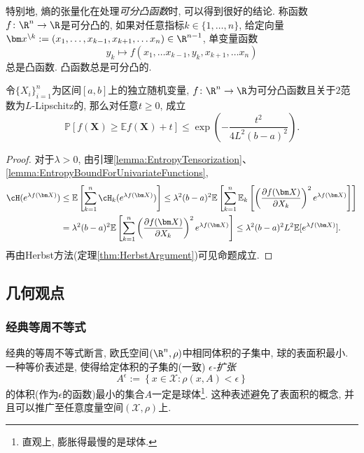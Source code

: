 特别地, 熵的张量化在处理\emph{可分凸函数}时, 可以得到很好的结论. 
称函数$f \colon \R^n \to \R$是可分凸的, 如果对任意指标$k \in \{1, \dots, n\}$, 给定向量$\bm x^{\backslash k} := (x_1, \dots, x_{k-1}, x_{k+1}, \dots x_n) \in \R^{n-1}$, 单变量函数
\begin{equation*}
	y_k \mapsto f(x_1, \dots x_{k-1}, y_k, x_{k+1}, \dots x_n)
\end{equation*}
总是凸函数. 
凸函数总是可分凸的. 

\begin{proposition}
	令$\{X_i\}_{i=1}^n$为区间$[a, b]$上的独立随机变量, $f \colon \R^n \to \R$为可分凸函数且关于$2$范数为$L$-Lipschitz的, 那么对任意$t \geq 0$, 成立
	\begin{equation*}
		\mathbb{P}[f(\bm X) \geq \mathbb{E}f(\bm X) + t] 
		\leq \exp \left( - \frac{t^2}{4L^2 (b-a)^2} \right). 
	\end{equation*}	
\end{proposition}
\begin{proof}
	对于$\lambda > 0$, 由引理\ref{lemma:EntropyTensorization}、 \ref{lemma:EntropyBoundForUnivariateFunctions}, 
	\begin{align*}
		\cH(e^{\lambda f(\bm X)})
		&\leq \mathbb{E}\left[ \sum_{k=1}^n \cH_k (e^{\lambda f(\bm X)}) \right]
		\leq \lambda^2 (b-a)^2  \mathbb{E}\left[ \sum_{k=1}^n \mathbb{E}_k\left[ \left(\frac{\partial f(\bm X)}{\partial X_k} \right)^2 e^{\lambda f(\bm X)}\right] \right] \\
		&= \lambda^2 (b-a)^2  \mathbb{E}\left[ \sum_{k=1}^n \left(\frac{\partial f(\bm X)}{\partial X_k} \right)^2 e^{\lambda f(\bm X)}\right]
		\leq \lambda^2 (b-a)^2 L^2 \mathbb{E}[e^{\lambda f(\bm X)}]. 
	\end{align*}
	再由Herbst方法(定理\ref{thm:HerbstArgument})可见命题成立. 
\end{proof}



\subsection{几何观点}

\subsubsection{经典等周不等式}

经典的等周不等式断言, 欧氏空间$(\R^n, \rho)$中相同体积的子集中, 球的表面积最小. 
一种等价表述是, 使得给定体积的子集的(一致) \emph{$\epsilon$-扩张}
\begin{equation*}
	A^{\epsilon} := \left\{ x \in \mathcal{X} \colon \rho(x, A) < \epsilon \right\}
\end{equation*}
的体积(作为$\epsilon$的函数)最小的集合$A$一定是球体\footnote{直观上, 膨胀得最慢的是球体.}.  
这种表述避免了表面积的概念, 并且可以推广至任意度量空间$(\mathcal{X}, \rho)$上. 

